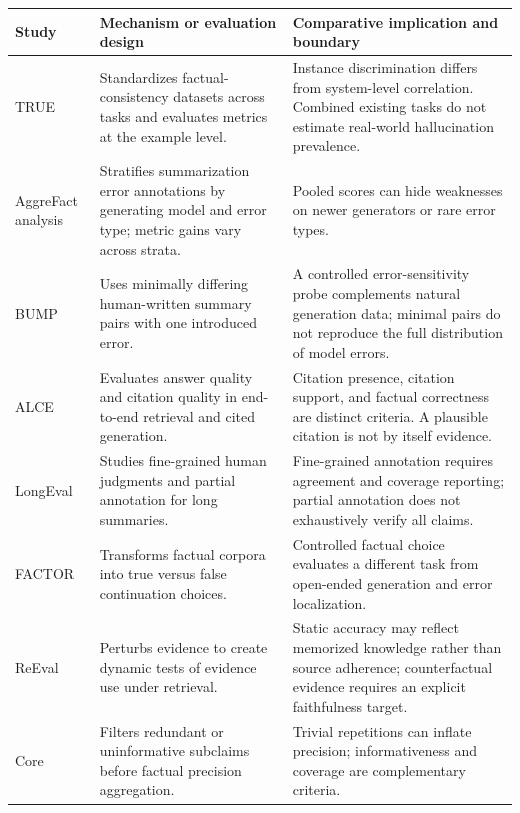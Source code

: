 \begin{table}[tp]
\centering\small\setlength{\tabcolsep}{5pt}\renewcommand{\arraystretch}{1.18}
\begin{tabularx}{\textwidth}{@{}p{}p{}X@{}}\toprule
Study & Mechanism or evaluation design & Comparative implication and boundary \\\midrule
TRUE \citep{honovich-etal-2022-true-evaluating} & Standardizes factual-consistency datasets across tasks and evaluates metrics at the example level. & Instance discrimination differs from system-level correlation. Combined existing tasks do not estimate real-world hallucination prevalence. \\
AggreFact analysis \citep{tang-etal-2023-understanding} & Stratifies summarization error annotations by generating model and error type; metric gains vary across strata. & Pooled scores can hide weaknesses on newer generators or rare error types. \\
BUMP \citep{ma-etal-2023-bump} & Uses minimally differing human-written summary pairs with one introduced error. & A controlled error-sensitivity probe complements natural generation data; minimal pairs do not reproduce the full distribution of model errors. \\
ALCE \citep{gao-etal-2023-enabling} & Evaluates answer quality and citation quality in end-to-end retrieval and cited generation. & Citation presence, citation support, and factual correctness are distinct criteria. A plausible citation is not by itself evidence. \\
LongEval \citep{krishna-etal-2023-longeval} & Studies fine-grained human judgments and partial annotation for long summaries. & Fine-grained annotation requires agreement and coverage reporting; partial annotation does not exhaustively verify all claims. \\
FACTOR \citep{muhlgay-etal-2024-generating} & Transforms factual corpora into true versus false continuation choices. & Controlled factual choice evaluates a different task from open-ended generation and error localization. \\
ReEval \citep{yu-etal-2024-reeval} & Perturbs evidence to create dynamic tests of evidence use under retrieval. & Static accuracy may reflect memorized knowledge rather than source adherence; counterfactual evidence requires an explicit faithfulness target. \\
Core \citep{jiang-etal-2025-core} & Filters redundant or uninformative subclaims before factual precision aggregation. & Trivial repetitions can inflate precision; informativeness and coverage are complementary criteria. \\

\end{tabularx}
\end{table}

